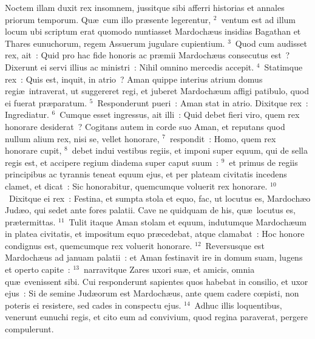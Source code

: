 \lettrine[lines=3,image=true,loversize=0.05,lraise=-0.03]{N}{}octem illam duxit rex insomnem, jussitque sibi afferri historias et annales priorum temporum. Qu\ae\ cum illo pr\ae sente legerentur,
${}^{2}$~ventum est ad illum locum ubi scriptum erat quomodo nuntiasset Mardoch\ae us insidias Bagathan et Thares eunuchorum, regem Assuerum jugulare cupientium.
${}^{3}$~Quod cum audisset rex, ait~: Quid pro hac fide honoris ac pr\ae mii Mardoch\ae us consecutus est~? Dixerunt ei servi illius ac ministri~: Nihil omnino mercedis accepit.
${}^{4}$~Statimque rex~: Quis est, inquit, in atrio~? Aman quippe interius atrium domus regi\ae\ intraverat, ut suggereret regi, et juberet Mardoch\ae um affigi patibulo, quod ei fuerat pr\ae paratum.
${}^{5}$~Responderunt pueri~: Aman stat in atrio. Dixitque rex~: Ingrediatur.
${}^{6}$~Cumque esset ingressus, ait illi~: Quid debet fieri viro, quem rex honorare desiderat~? Cogitans autem in corde suo Aman, et reputans quod nullum alium rex, nisi se, vellet honorare,
${}^{7}$~respondit~: Homo, quem rex honorare cupit,
${}^{8}$~debet indui vestibus regiis, et imponi super equum, qui de sella regis est, et accipere regium diadema super caput suum~:
${}^{9}$~et primus de regiis principibus ac tyrannis teneat equum ejus, et per plateam civitatis incedens clamet, et dicat~: Sic honorabitur, quemcumque voluerit rex honorare.
${}^{10}$~Dixitque ei rex~: Festina, et sumpta stola et equo, fac, ut locutus es, Mardoch\ae o Jud\ae o, qui sedet ante fores palatii. Cave ne quidquam de his, qu\ae\ locutus es, pr\ae termittas.
${}^{11}$~Tulit itaque Aman stolam et equum, indutumque Mardoch\ae um in platea civitatis, et impositum equo pr\ae cedebat, atque clamabat~: Hoc honore condignus est, quemcumque rex voluerit honorare.
${}^{12}$~Reversusque est Mardoch\ae us ad januam palatii~: et Aman festinavit ire in domum suam, lugens et operto capite~:
${}^{13}$~narravitque Zares uxori su\ae , et amicis, omnia qu\ae\ evenissent sibi. Cui responderunt sapientes quos habebat in consilio, et uxor ejus~: Si de semine Jud\ae orum est Mardoch\ae us, ante quem cadere cœpisti, non poteris ei resistere, sed cades in conspectu ejus.
${}^{14}$~Adhuc illis loquentibus, venerunt eunuchi regis, et cito eum ad convivium, quod regina paraverat, pergere compulerunt.

